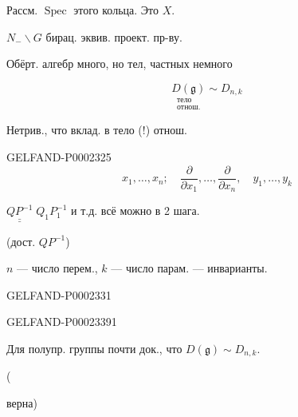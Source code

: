 Рассм. $\operatorname{Spec}$ этого кольца. Это $X$.



$N_-\backslash G$ бирац. эквив. проект. пр-ву.



Обёрт. алгебр много, но тел, частных немного



\begin{equation*}
 \underset{\substack{\text{тело}\\\text{отнош.}}}{D(\mathfrak g)}\sim D_{n,k}
\end{equation*}



Нетрив., что вклад. в тело (!) отнош.



\begin{GelfandAdjacentEvidence}{GELFAND-P000232}{5}
\begin{equation*}
 x_1,\ldots,x_n;\quad
 \frac{\partial}{\partial x_1},\ldots,\frac{\partial}{\partial x_n},\quad
 y_1,\ldots,y_k
\end{equation*}



\end{GelfandAdjacentEvidence}


$\underline{\underline{QP^{-1}}}\;Q_1P_1^{-1}$ и т.д. всё можно в 2 шага.

(дост. $QP^{-1}$)



$n$ — число перем., $k$ — число парам. — инварианты.





\begin{GelfandAdjacentEvidence}{GELFAND-P000233}{1}




\end{GelfandAdjacentEvidence}\begin{GelfandAdjacentEvidence}{GELFAND-P000233}{91}


Для полупр. группы почти док., что $D(\mathfrak g)\sim D_{n,k}$.




(

 верна)

\end{GelfandAdjacentEvidence}

